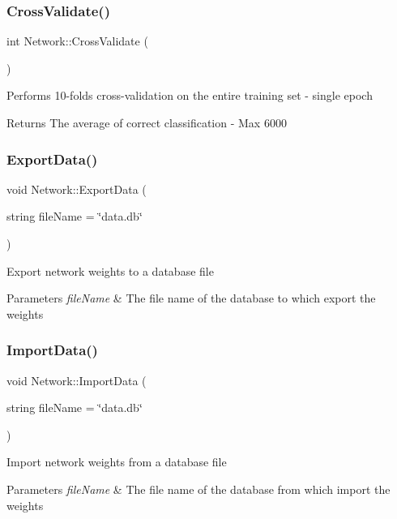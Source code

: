 \subsubsection{\texorpdfstring{Cross\+Validate()}{CrossValidate()}}
{\footnotesize\ttfamily int Network\+::\+Cross\+Validate (\begin{DoxyParamCaption}{ }\end{DoxyParamCaption})}

Performs 10-\/folds cross-\/validation on the entire training set -\/ single epoch \begin{DoxyReturn}{Returns}
The average of correct classification -\/ Max 6000 
\end{DoxyReturn}
\mbox{\label{class_network_a21a7dd636e2c712d3e3cd64ba4852197}} 
\subsubsection{\texorpdfstring{Export\+Data()}{ExportData()}}
{\footnotesize\ttfamily void Network\+::\+Export\+Data (\begin{DoxyParamCaption}\item[{string}]{file\+Name = {\ttfamily \char`\"{}data.db\char`\"{}} }\end{DoxyParamCaption})}

Export network weights to a database file 
\begin{DoxyParams}{Parameters}
{\em file\+Name} & The file name of the database to which export the weights \\
\hline
\end{DoxyParams}
\mbox{\label{class_network_ae41cc8ad394e1e95ede281a7d7af79f7}} 
\subsubsection{\texorpdfstring{Import\+Data()}{ImportData()}}
{\footnotesize\ttfamily void Network\+::\+Import\+Data (\begin{DoxyParamCaption}\item[{string}]{file\+Name = {\ttfamily \char`\"{}data.db\char`\"{}} }\end{DoxyParamCaption})}

Import network weights from a database file 
\begin{DoxyParams}{Parameters}
{\em file\+Name} & The file name of the database from which import the weights \\
\hline
\end{DoxyParams}
\mbox{\label{class_network_a15cc78648716e93c1c0df54f75d70a98}} 
